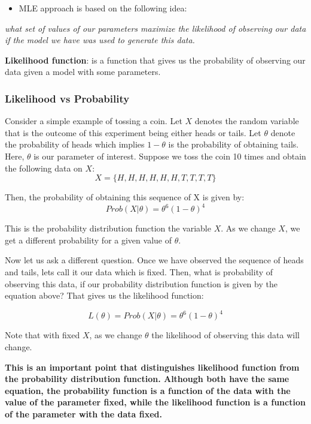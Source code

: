 \documentclass[]{book}
\providecommand{\tightlist}{%
  \setlength{\itemsep}{0pt}\setlength{\parskip}{0pt}}
\theoremstyle{definition}
\theoremstyle{definition}
\theoremstyle{definition}
\theoremstyle{remark}
\begin{document}
\begin{itemize}
\tightlist
\item
  MLE approach is based on the following idea:
\end{itemize}

\emph{what set of values of our parameters maximize the likelihood of observing our data if the model we have was used to generate this data.}

\textbf{Likelihood function}: is a function that gives us the probability of observing our data given a model with some parameters.

\hypertarget{likelihood-vs-probability}{%
\subsubsection{Likelihood vs Probability}\label{likelihood-vs-probability}}

Consider a simple example of tossing a coin. Let \(X\) denotes the random variable that is the outcome of this experiment being either heads or tails. Let \(\theta\) denote the probability of heads which implies \(1-\theta\) is the probability of obtaining tails. Here, \(\theta\) is our parameter of interest. Suppose we toss the coin 10 times and obtain the following data on \(X\):
\[X=\{H,H,H,H,H,H,T,T,T,T\}\]

Then, the probability of obtaining this sequence of X is given by:
\[Prob (X|\theta)=\theta^6 (1-\theta)^4\]

This is the probability distribution function the variable \(X\). As we change \(X\), we get a different probability for a given value of \(\theta\).

Now let us ask a different question. Once we have observed the sequence of heads and tails, lets call it our data which is fixed. Then, what is probability of observing this data, if our probability distribution function is given by the equation above? That gives us the likelihood function:

\[ L(\theta)=Prob(X|\theta)=\theta^6(1-\theta)^4\]

Note that with fixed \(X\), as we change \(\theta\) the likelihood of observing this data will change.

\textbf{This is an important point that distinguishes likelihood function from the probability distribution function. Although both have the same equation, the probability function is a function of the data with the value of the parameter fixed, while the likelihood function is a function of the parameter with the data fixed.}
\end{document}
